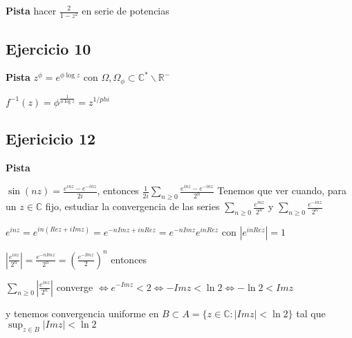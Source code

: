 \textbf{Pista}
hacer $\frac{2}{1-z^2}$ en serie de potencias





\subsection{Ejercicio 10}
\textbf{Pista}
$z^{\phi} = e^{ \phi \log z}$ con $\Omega,\Omega_{\phi} \subset \mathbb{C}^{\ast}\backslash \mathbb{R^-}$

$f^{-1}(z) = \phi^{\frac{1}{\phi\log z}} = z^{1/{phi}}$


\subsection{Ejericicio 12}
\textbf{Pista}

$\sin(nz) = \frac{e^{inz}-e^{-inz}}{2i}$, entonces
$\frac{1}{2i} \sum_{n\geq 0} \frac{e^{inz}-e^{-inz}}{2^n}$
Tenemos que ver cuando, para un $z\in\mathbb{C}$ fijo, estudiar la convergencia de las series
$\sum_{n\geq 0} \frac{e^{inz}}{2^n}$ y $\sum_{n\geq 0} \frac{e^{-inz}}{2^n}$

$e^{inz} = e^{in(Rez+iImz)} = e^{-nImz+inRez} = e^{-nImz}e^{inRez}$ con $|e^{inRez}|=1$

$|\frac{e^{inz}}{2^n}| = \frac{e^{-nImz}}{2^n} = (\frac{e^{-Imz}}{2})^n$
entonces

$\sum_{n\geq 0} |\frac{e^{inz}}{2^n}|$ converge $\Longleftrightarrow e^{-Imz} < 2 \Longleftrightarrow -Imz < \ln 2 \Longleftrightarrow -\ln 2 < Imz$

y tenemos convergencia uniforme en $B\subset A= \{ z\in\mathbb{C} : |Imz|<\ln 2 \}$ tal que $\sup_{z\in B} |Imz| < \ln 2$